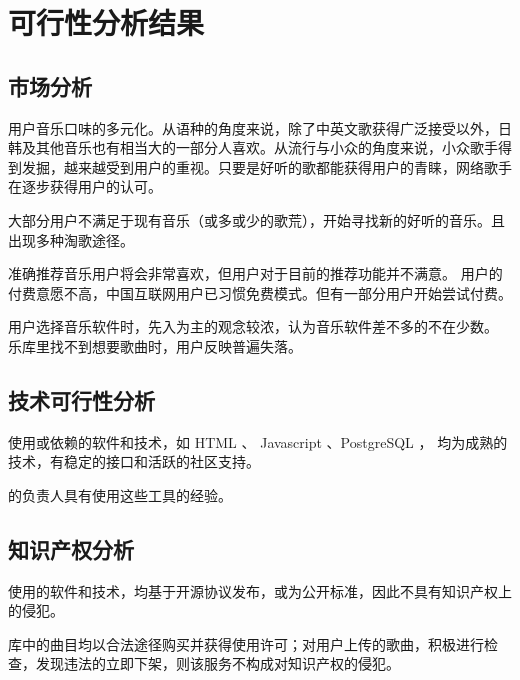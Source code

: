 \chapter{可行性分析结果}

\section{市场分析}

用户音乐口味的多元化。从语种的角度来说，除了中英文歌获得广泛接受以外，日韩及其他音乐也有相当大的一部分人喜欢。从流行与小众的角度来说，小众歌手得到发掘，越来越受到用户的重视。只要是好听的歌都能获得用户的青睐，网络歌手在逐步获得用户的认可。

大部分用户不满足于现有音乐（或多或少的歌荒），开始寻找新的好听的音乐。且出现多种淘歌途径。

准确推荐音乐用户将会非常喜欢，但用户对于目前的推荐功能并不满意。
用户的付费意愿不高，中国互联网用户已习惯免费模式。但有一部分用户开始尝试付费。

用户选择音乐软件时，先入为主的观念较浓，认为音乐软件差不多的不在少数。
乐库里找不到想要歌曲时，用户反映普遍失落。

\section{技术可行性分析}

\proname 使用或依赖的软件和技术，如 HTML 、 Javascript 、PostgreSQL ， 均为成熟的技术，有稳定的接口和活跃的社区支持。

\proname 的负责人具有使用这些工具的经验。

\section{知识产权分析}

\proname 使用的软件和技术，均基于开源协议发布，或为公开标准，因此不具有知识产权上的侵犯。

库中的曲目均以合法途径购买并获得使用许可；对用户上传的歌曲，积极进行检查，发现违法的立即下架，则该服务不构成对知识产权的侵犯。

